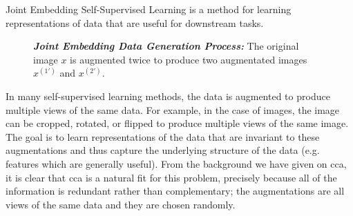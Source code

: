 Joint Embedding Self-Supervised Learning is a method for learning representations of data that are useful for downstream tasks.

\begin{figure}
    \centering
    \caption[Joint Embedding Data Generation Process]{\textit{\textbf{Joint Embedding Data Generation Process:}} The original image \(x\) is augmented twice to produce two augmentated images \(x^{(1')}\) and \(x^{(2')}\).}
\end{figure}

In many self-supervised learning methods, the data is augmented to produce multiple views of the same data.
For example, in the case of images, the image can be cropped, rotated, or flipped to produce multiple views of the same image.
The goal is to learn representations of the data that are invariant to these augmentations and thus capture the underlying structure of the data (e.g. features which are generally useful).
From the background we have given on \acrshort{cca}, it is clear that \acrshort{cca} is a natural fit for this problem, precisely because all of the information is redundant rather than complementary; the augmentations are all views of the same data and they are chosen randomly.





